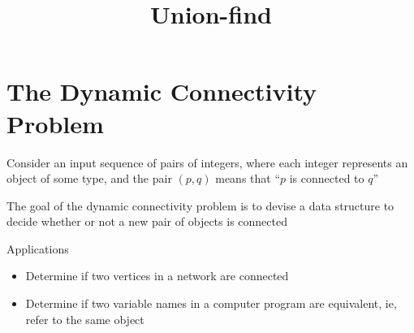 \documentclass[8pt,a4paper,compress]{beamer}
\title{Union-find}
\date{}
\begin{document}
\begin{frame}
\vfill
\titlepage
\end{frame}

\section{The Dynamic Connectivity Problem}
\begin{frame}[fragile]
\begin{minipage}{250pt}
\pause

Consider an input sequence of pairs of integers, where each integer represents an object of some type, and the pair $(p, q)$ means that ``$p$ is connected to $q$''

\pause\bigskip

The goal of the dynamic connectivity problem is to devise a data structure to decide whether or not a new pair of objects is connected 

\pause\bigskip

Applications
\begin{itemize}
\pause
\item Determine if two vertices in a network are connected

\pause
\item Determine if two variable names in a computer program are equivalent, ie, refer to the same object


\end{itemize}
\end{minipage}
\end{frame}
\end{document}
